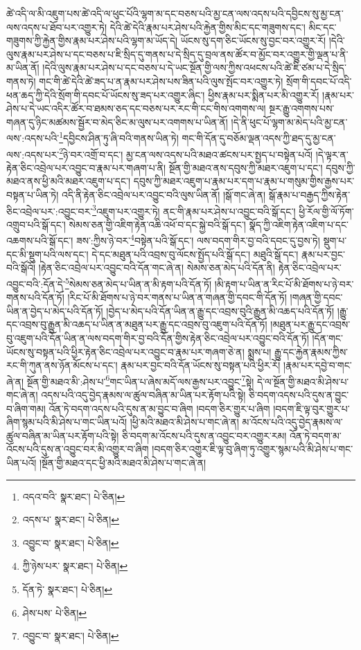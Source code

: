 ཚེ་འདི་ལ་མི་འཇུག་པས་ཚེ་འདི་ལ་ཕུང་པོའི་ལྷག་མ་དང་བཅས་པའི་མྱ་ངན་ལས་འདས་པའི་དབྱིངས་སུ་མྱ་ངན་ལས་འདས་པ་ཐོབ་པར་འགྱུར་ཏེ། དེའི་ཚེ་དེའི་རྣམ་པར་ཤེས་པའི་རྐྱེན་གྱིས་མིང་དང་གཟུགས་དང་། མིང་དང་གཟུགས་ཀྱི་རྐྱེན་གྱིས་རྣམ་པར་ཤེས་པའི་ལྷག་མ་ཡོད་དེ། ཡོངས་སུ་དག་ཅིང་ཡོངས་སུ་བྱང་བར་འགྱུར་རོ། །དེའི་ལུས་རྣམ་པར་ཤེས་པ་དང་བཅས་པ་ཇི་སྲིད་དུ་གནས་པ་དེ་སྲིད་དུ་བྲལ་ནས་ཚོར་བ་མྱོང་བར་འགྱུར་གྱི་ལྡན་པ་ནི་མ་ཡིན་ནོ། །དེའི་ལུས་རྣམ་པར་ཤེས་པ་དང་བཅས་པ་དེ་ཡང་སྔོན་གྱི་ལས་ཀྱིས་འཕངས་པའི་ཚེ་ཇི་ཙམ་པ་དེ་སྲིད་གནས་ཏེ། གང་གི་ཚེ་དེའི་ཚེ་ཟད་པ་ན་རྣམ་པར་ཤེས་པས་ཟིན་པའི་ལུས་སྤོང་བར་འགྱུར་ཏེ། སྲོག་གི་དབང་པོ་འདི་ཕན་ཆད་ཀྱི་དེའི་སྲོག་གི་དབང་པོ་ཡོངས་སུ་ཟད་པར་འགྱུར་ཞིང་། ཕྱིས་རྣམ་པར་སྨིན་པར་མི་འགྱུར་རོ། །རྣམ་པར་ཤེས་པ་དེ་ཡང་འདིར་ཚོར་བ་ཐམས་ཅད་དང་བཅས་པར་རང་གི་ངང་གིས་འགགས་ལ། སྔར་རྒྱུ་འགགས་པས་གཞན་དུ་ཉིང་མཚམས་སྦྱོར་བ་མེད་ཅིང་མ་ལུས་པར་འགགས་པ་ཡིན་ནོ། །དེ་ནི་ཕུང་པོ་ལྷག་མ་མེད་པའི་མྱ་ངན་ལས་:འདས་པའི་\footnote{འདའ་བའི་  སྣར་ཐང་།  པེ་ཅིན། }དབྱིངས་ཤིན་ཏུ་ཞི་བའི་གནས་ཡིན་ཏེ། གང་གི་དོན་དུ་བཅོམ་ལྡན་འདས་ཀྱི་ཐད་དུ་མྱ་ངན་ལས་:འདས་པར་\footnote{འདས་པ་  སྣར་ཐང་།  པེ་ཅིན། }ཉེ་བར་འགྲོ་བ་དང་། མྱ་ངན་ལས་འདས་པའི་མཐའ་ཚངས་པར་སྤྱད་པ་བསྟེན་པའོ། །དེ་ལྟར་ན་རྟེན་ཅིང་འབྲེལ་པར་འབྱུང་བ་རྣམ་པར་གཞག་པ་ནི། སྔོན་གྱི་མཐའ་ནས་དབུས་ཀྱི་མཐར་འཇུག་པ་དང་། དབུས་ཀྱི་མཐའ་ནས་ཕྱི་མའི་མཐར་འཇུག་པ་དང་། དབུས་ཀྱི་མཐར་འཇུག་པ་རྣམ་པར་དག་པ་རྣམ་པ་གསུམ་གྱིས་རྒྱས་པར་བསྟན་པ་ཡིན་ཏེ། འདི་ནི་རྟེན་ཅིང་འབྲེལ་པར་འབྱུང་བའི་ལུས་ཡིན་ནོ། །སྒོ་གང་ཞེ་ན། སྒོ་རྣམ་པ་བརྒྱད་ཀྱིས་རྟེན་ཅིང་འབྲེལ་པར་:འབྱུང་བར་\footnote{འབྱུང་བ་  སྣར་ཐང་།  པེ་ཅིན། }འཇུག་པར་འགྱུར་ཏེ། ནང་གི་རྣམ་པར་ཤེས་པ་འབྱུང་བའི་སྒོ་དང་། ཕྱི་རོལ་གྱི་ལོ་ཏོག་འགྲུབ་པའི་སྒོ་དང་། སེམས་ཅན་གྱི་འཇིག་རྟེན་འཆི་འཕོ་བ་དང་སྐྱེ་བའི་སྒོ་དང་། སྣོད་ཀྱི་འཇིག་རྟེན་འཇིག་པ་དང་འཆགས་པའི་སྒོ་དང་། ཟས་:ཀྱིས་ཉེ་བར་\footnote{ཀྱི་ཉེས་པར་  སྣར་ཐང་།  པེ་ཅིན། }བསྟེན་པའི་སྒོ་དང་། ལས་བདག་གིར་བྱ་བའི་དབང་དུ་བྱས་ཏེ། སྡུག་པ་དང་མི་སྡུག་པའི་ལས་དང་། དེ་དང་མཐུན་པའི་འབྲས་བུ་ལོངས་སྤྱོད་པའི་སྒོ་དང་། མཐུའི་སྒོ་དང་། རྣམ་པར་བྱང་བའི་སྒོའོ། །རྟེན་ཅིང་འབྲེལ་པར་འབྱུང་བའི་དོན་གང་ཞེ་ན། སེམས་ཅན་མེད་པའི་དོན་ནི། རྟེན་ཅིང་འབྲེལ་པར་འབྱུང་བའི་:དོན་དེ་\footnote{དོན་ཏེ་  སྣར་ཐང་།  པེ་ཅིན། }སེམས་ཅན་མེད་པ་ཡིན་ན་མི་རྟག་པའི་དོན་ཏོ། །མི་རྟག་པ་ཡིན་ན་རིང་པོ་མི་ཐོགས་པ་ཉེ་བར་གནས་པའི་དོན་ཏོ། །རིང་པོ་མི་ཐོགས་པ་ཉེ་བར་གནས་པ་ཡིན་ན་གཞན་གྱི་དབང་གི་དོན་ཏོ། །གཞན་གྱི་དབང་ཡིན་ན་བྱེད་པ་མེད་པའི་དོན་ཏོ། །བྱེད་པ་མེད་པའི་དོན་ཡིན་ན་རྒྱུ་དང་འབྲས་བུའི་རྒྱུན་མི་འཆད་པའི་དོན་ཏོ། །རྒྱུ་དང་འབྲས་བུ་རྒྱུན་མི་འཆད་པ་ཡིན་ན་མཐུན་པར་རྒྱུ་དང་འབྲས་བུ་འཇུག་པའི་དོན་ཏོ། །མཐུན་པར་རྒྱུ་དང་འབྲས་བུ་འཇུག་པའི་དོན་ཡིན་ན་ལས་བདག་གིར་བྱ་བའི་དོན་གྱིས་རྟེན་ཅིང་འབྲེལ་པར་འབྱུང་བའི་དོན་ཏོ། །དོན་གང་ཡོངས་སུ་བསྟན་པའི་ཕྱིར་རྟེན་ཅིང་འབྲེལ་པར་འབྱུང་བ་རྣམ་པར་གཞག་ཅེ་ན། སྨྲས་པ། རྒྱུ་དང་རྐྱེན་རྣམས་ཀྱིས་རང་གི་ཀུན་ནས་ཉོན་མོངས་པ་དང་། རྣམ་པར་བྱང་བའི་དོན་ཡོངས་སུ་བསྟན་པའི་ཕྱིར་རོ། །རྣམ་པར་དབྱེ་བ་གང་ཞེ་ན། སྔོན་གྱི་མཐའ་མི་:ཤེས་པ་\footnote{ཤེས་པས་  པེ་ཅིན། }གང་ཡིན་པ་ཞེས་མདོ་ལས་རྒྱས་པར་འབྱུང་\footnote{འབྱུང་བ་  སྣར་ཐང་།  པེ་ཅིན། }སྟེ། དེ་ལ་སྔོན་གྱི་མཐའ་མི་ཤེས་པ་གང་ཞེ་ན། འདས་པའི་འདུ་བྱེད་རྣམས་ལ་ཚུལ་བཞིན་མ་ཡིན་པར་རྟོག་པའི་སྟེ། ཅི་བདག་འདས་པའི་དུས་ན་བྱུང་བ་ཞིག་གམ། འོན་ཏེ་བདག་འདས་པའི་དུས་ན་མ་བྱུང་བ་ཞིག །བདག་ཅིར་གྱུར་པ་ཞིག །བདག་ཇི་ལྟ་བུར་གྱུར་པ་ཞིག་སྙམ་པའི་མི་ཤེས་པ་གང་ཡིན་པའོ། །ཕྱི་མའི་མཐའ་མི་ཤེས་པ་གང་ཞེ་ན། མ་འོངས་པའི་འདུ་བྱེད་རྣམས་ལ་ཚུལ་བཞིན་མ་ཡིན་པར་རྟོག་པའི་སྟེ། ཅི་བདག་མ་འོངས་པའི་དུས་ན་འབྱུང་བར་འགྱུར་རམ། འོན་ཏེ་བདག་མ་འོངས་པའི་དུས་ན་འབྱུང་བར་མི་འགྱུར་བ་ཞིག །བདག་ཅིར་འགྱུར་ཇི་ལྟ་བུ་ཞིག་ཏུ་འགྱུར་སྙམ་པའི་མི་ཤེས་པ་གང་ཡིན་པའོ། །སྔོན་གྱི་མཐའ་དང་ཕྱི་མའི་མཐའ་མི་ཤེས་པ་གང་ཞེ་ན། 